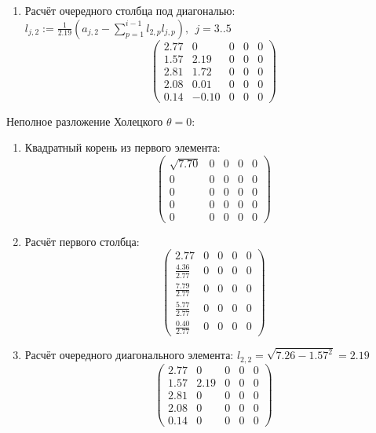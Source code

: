 \begin{multicols}{3}
\begin{enumerate}
    \item Расчёт очередного столбца под диагональю: $l_{j,2} := \frac{1}{2.19}(a_{j,2} - \sum_{p=1}^{i-1}l_{2,p}l_{j,p}),~~j=3..5$
    $$\begin{pmatrix}
        2.77&  0   & 0& 0& 0\\
        1.57&  2.19& 0& 0& 0\\
        2.81&  1.72& 0& 0& 0\\
        2.08&  0.01& 0& 0& 0\\
        0.14& -0.10& 0& 0& 0
    \end{pmatrix}$$
\end{enumerate}

\columnbreak
Неполное разложение Холецкого $\theta=0$:
\begin{enumerate}
    \item Квадратный корень из первого элемента:
    $$\begin{pmatrix}
        \sqrt{7.70} & 0 & 0 & 0 & 0 \\
        0           & 0 & 0 & 0 & 0 \\
        0           & 0 & 0 & 0 & 0 \\
        0           & 0 & 0 & 0 & 0 \\
        0           & 0 & 0 & 0 & 0
    \end{pmatrix}$$

    \item Расчёт первого столбца:
    $$\begin{pmatrix}
        2.77              & 0 & 0 & 0 & 0 \\
        \frac{4.36}{2.77} & 0 & 0 & 0 & 0 \\
        \frac{7.79}{2.77} & 0 & 0 & 0 & 0 \\
        \frac{5.77}{2.77} & 0 & 0 & 0 & 0 \\
        \frac{0.40}{2.77} & 0 & 0 & 0 & 0
    \end{pmatrix}$$

    \item Расчёт очередного диагонального элемента: $l_{2,2} = \sqrt{7.26 - 1.57^2} = 2.19$
    $$\begin{pmatrix}
        2.77 & 0    & 0 & 0 & 0 \\
        1.57 & 2.19 & 0 & 0 & 0 \\
        2.81 & 0    & 0 & 0 & 0 \\
        2.08 & 0    & 0 & 0 & 0 \\
        0.14 & 0    & 0 & 0 & 0
    \end{pmatrix}$$


\end{enumerate}
\end{multicols}
